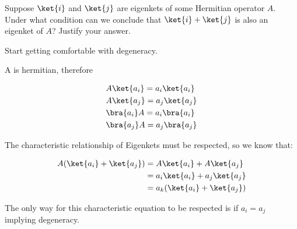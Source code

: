 \begin{question}

  Suppose $\ket{i}$ and $\ket{j}$ are eigenkets of some Hermitian
  operator $A$. Under what condition can we conclude that $\ket{i} +
  \ket{j}$ is also an eigenket of $A$? Justify your answer.

\end{question}

\begin{purpose}
  Start getting comfortable with degeneracy.
\end{purpose}

\begin{answer}

  A is hermitian, therefore
  
  \begin{equation}
    \begin{split}
      &A\ket{a_i} = a_i\ket{a_i}\\
      &A\ket{a_j} = a_j\ket{a_j}\\
      &\bra{a_i}A = a_i\bra{a_i}\\
      &\bra{a_j}A = a_j\bra{a_j}\\
    \end{split}
  \end{equation}

  The characteristic relationship of Eigenkets must be respected, so
  we know that:

  \begin{equation}
    \begin{split}
      A(\ket{a_i} + \ket{a_j})
      &= A\ket{a_i} + A\ket{a_j}\\
      &= a_i\ket{a_i} + a_j\ket{a_j}\\
      &= a_k(\ket{a_i} + \ket{a_j})\\
    \end{split}
  \end{equation}

  The only way for this characteristic equation to be respected is
  if $a_i = a_j$ implying degeneracy.
  
\end{answer}
